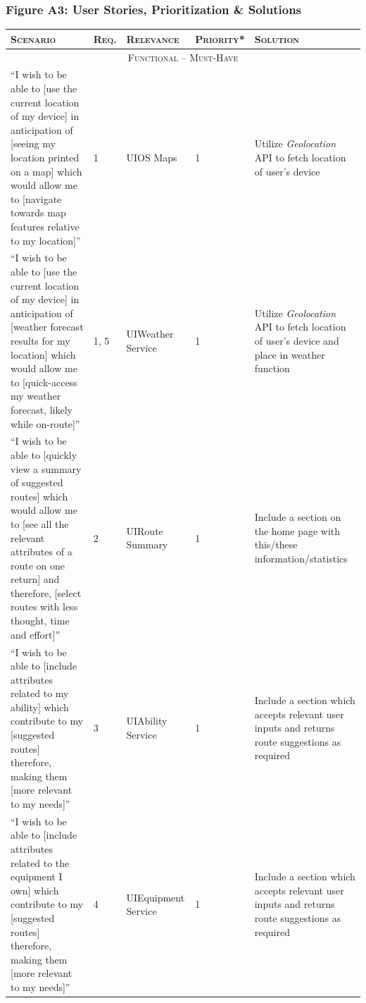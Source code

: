 \documentclass[11pt, english]{article}
\begin{document}
\newpage

		\subsubsection*{Figure A3: User Stories, Prioritization \& Solutions}
			
		\begin{center}
			\scriptsize
		\begin{longtable}{p{4cm}lp{1.5cm}lp{4cm}}
			\textsc{Scenario} & \textsc{Req.} & \textsc{Relevance} & \textsc{Priority*} & \textsc{Solution}\\
			\hline
			\hline
			\multicolumn{5}{c}{\textsc{Functional -- Must-Have}}\\
			\hline
			``I wish to be able to [use the current location of my device] in anticipation of [seeing my location printed on a map] which would allow me to [navigate towards map features relative to my location]'' & 1 & UI\newline OS Maps & 1 & Utilize \textit{Geolocation} API to fetch location of user's device\\
			``I wish to be able to [use the current location of my device] in anticipation of [weather forecast results for my location] which would allow me to [quick-access my weather forecast, likely while on-route]'' & 1, 5 & UI\newline Weather Service & 1 & Utilize \textit{Geolocation} API to fetch location of user's device and place in weather function\\
			``I wish to be able to [quickly view a summary of suggested routes] which would allow me to [see all the relevant attributes of a route on one return] and therefore, [select routes with less thought, time and effort]'' & 2 & UI\newline Route Summary & 1 & Include a section on the home page with this/these information/statistics\\
			``I wish to be able to [include attributes related to my ability] which contribute to my [suggested routes] therefore, making them [more relevant to my needs]'' & 3 & UI\newline Ability Service & 1 & Include a section which accepts relevant user inputs and returns route suggestions as required\\
			``I wish to be able to [include attributes related to the equipment I own] which contribute to my [suggested routes] therefore, making them [more relevant to my needs]'' & 4 & UI\newline Equipment Service & 1 & Include a section which accepts relevant user inputs and returns route suggestions as required\\

\end{longtable}
\end{center}
\end{document}
